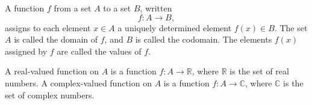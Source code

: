 A function $f$ from a set $A$ to a set $B$, written
$$f: A \to B,$$
assigns to each element $x \in A$ a uniquely determined element $f(x) \in B$. The set $A$ is called the domain of $f$, and $B$ is called the codomain. The elements $f(x)$ assigned by $f$ are called the values of $f$.

A real-valued function on $A$ is a function $f: A \to \mathbb{R}$, where $\mathbb{R}$ is the set of real numbers. A complex-valued function on $A$ is a function $f: A \to \mathbb{C}$, where $\mathbb{C}$ is the set of complex numbers.
